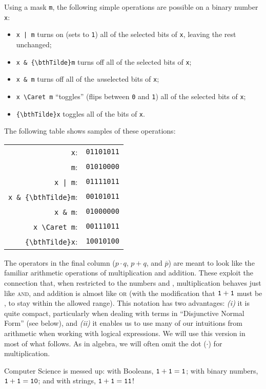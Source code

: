 Using a mask \verb|m|, the following simple operations are possible on a binary number \verb|x|:
\begin{itemize}
\item \verb-x | m- turns on (sets to \verb|1|) all of the selected bits of \verb|x|, leaving the rest unchanged;
\item \Verb|x & {\bthTilde}m| turns off all of the selected bits of \verb|x|;
\item \verb|x & m| turns off all of the \emph{un}selected bits of \verb|x|;
\item \Verb|x \Caret m| ``toggles'' (flips between \verb|0| and \verb|1|) all of the selected bits of \verb|x|;
\item \Verb|{\bthTilde}x| toggles all of the bits of \verb|x|.
\end{itemize}
The following table shows samples of these operations:
\begin{center}\begin{tabular}{rl}
\verb|x|:             & \verb|01101011|\\
\verb|m|:             & \verb|01010000|\\ \hline
\verb-x | m-:         & \verb|01111011|\\
\Verb|x & {\bthTilde}m|: & \verb|00101011|\\
\verb|x & m|:         & \verb|01000000|\\
\Verb|x \Caret m|:    & \verb|00111011|\\
\Verb|{\bthTilde}x|:     & \verb|10010100|
\end{tabular}\end{center}

The operators in the final column ($p\cdot q$, $p+q$, and $\overline{p}$) are meant to look like the familiar arithmetic operations of multiplication and addition. These exploit the connection that, when restricted to the numbers \0 and \1, multiplication behaves just like \textsc{and}, and addition is almost like \textsc{or} (with the modification that $\mathtt{1} + \mathtt{1}$ must be \1, to stay within the allowed range). This notation has two advantages: \textit{(i)} it is quite compact, particularly when dealing with terms in ``Disjunctive Normal Form'' (see below), and \textit{(ii)} it enables us to use many of our intuitions from arithmetic when working with logical expressions. We will use this version in most of what follows. As in algebra, we will often omit the dot ($\cdot$) for multiplication.

\begin{tailquote}
Computer Science is messed up: with Booleans, $\mathtt{1}+\mathtt{1}=\mathtt{1}$; with binary numbers, $\mathtt{1}+\mathtt{1}=\mathtt{1}\mathtt{0}$; and with strings, $\mathtt{1}+\mathtt{1}=\mathtt{1}\mathtt{1}$!
\end{tailquote}

